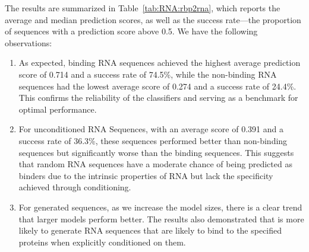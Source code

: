 The results are summarized in Table~\ref{tab:RNA:rbp2rna}, which reports the average and median prediction scores, as well as the success rate—the proportion of sequences with a prediction score above 0.5. We have the following observations: 
\begin{enumerate}
\item As expected, binding RNA sequences achieved the highest average prediction score of 0.714 and a success rate of 74.5\%, while the non-binding RNA sequences had the lowest average score of 0.274 and a success rate of 24.4\%. This confirms the reliability of the classifiers and serving as a benchmark for optimal performance.
\item For unconditioned RNA Sequences, with an average score of 0.391 and a success rate of 36.3\%, these sequences performed better than non-binding sequences but significantly worse than the binding sequences. This suggests that random RNA sequences have a moderate chance of being predicted as binders due to the intrinsic properties of RNA but lack the specificity achieved through conditioning.
\item For \ourM{} generated sequences, as we increase the model sizes, there is a clear trend that larger models perform better. The results also demonstrated that \ourM{} is more likely to generate RNA sequences that are likely to bind to the specified proteins when explicitly conditioned on them.
\end{enumerate}



%


